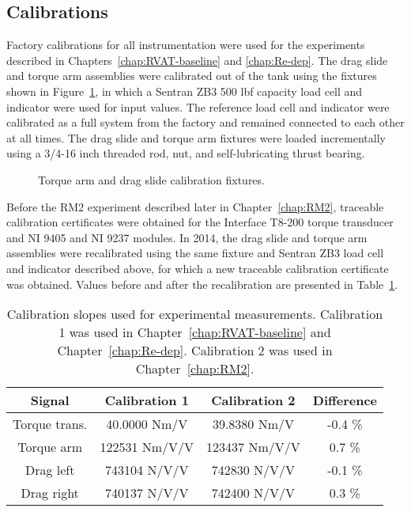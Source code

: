 \subsection{Calibrations}

Factory calibrations for all instrumentation were used for the experiments
described in Chapters~\ref{chap:RVAT-baseline} and \ref{chap:Re-dep}. The drag
slide and torque arm assemblies were calibrated out of the tank using the
fixtures shown in Figure~\ref{fig:calibration-fixtures}, in which a Sentran ZB3
500 lbf capacity load cell and indicator were used for input values. The
reference load cell and indicator were calibrated as a full system from the
factory and remained connected to each other at all times. The drag slide and
torque arm fixtures were loaded incrementally using a 3/4-16 inch threaded rod,
nut, and self-lubricating thrust bearing.

\begin{figure}
    \caption{Torque arm and drag slide calibration fixtures.}
    
    \label{fig:calibration-fixtures}
\end{figure}

Before the RM2 experiment described later in Chapter~\ref{chap:RM2}, traceable
calibration certificates were obtained for the Interface T8-200 torque
transducer and NI 9405 and NI 9237 modules. In 2014, the drag slide and torque
arm assemblies were recalibrated using the same fixture and Sentran ZB3 load
cell and indicator described above, for which a new traceable calibration
certificate was obtained. Values before and after the recalibration are
presented in Table~\ref{tab:calibrations}.

\begin{table}
    \centering
\begin{tabular}{c|c|c|c}
    Signal & Calibration 1 & Calibration 2 & Difference \\ 
    \hline 
    Torque trans. & 40.0000 Nm/V & 39.8380 Nm/V & -0.4 \% \\ 
    Torque arm & 122531 Nm/V/V & 123437 Nm/V/V & 0.7 \% \\ 
    Drag left & 743104 N/V/V & 742830 N/V/V & -0.1 \% \\ 
    Drag right & 740137 N/V/V & 742400 N/V/V & 0.3 \% \\ 
\end{tabular}
    \caption{Calibration slopes used for experimental measurements. Calibration
        1 was used in Chapter~\ref{chap:RVAT-baseline} and
        Chapter~\ref{chap:Re-dep}. Calibration 2 was used in
        Chapter~\ref{chap:RM2}.}
    
    \label{tab:calibrations}
\end{table}


